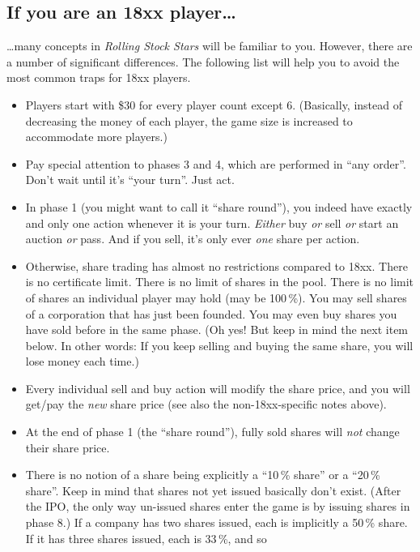\documentclass[10pt,final]{report}
\begin{document}
\begin{multicols}{2}
\section{If you are an 18xx player\dots}

\dots many concepts in \emph{Rolling Stock Stars} will be familiar to
you. However, there are a number of significant differences. The
following list will help you to avoid the most common traps for 18xx
players.

\begin{itemize}
\item Players start with \$30 for every player count except
  6. (Basically, instead of decreasing the money of each player, the
  game size is increased to accommodate more players.)
\item Pay special attention to phases 3 and 4, which are performed in
  ``any order''. Don't wait until it's ``your turn''. Just act.
\item In phase 1 (you might want to call it ``share round''), you
  indeed have exactly and only one action whenever it is your
  turn. \emph{Either} buy \emph{or} sell \emph{or} start an auction
  \emph{or} pass. And if you sell, it's only ever \emph{one} share per
  action.
\item Otherwise, share trading has almost no restrictions compared to
  18xx. There is no certificate limit. There is no limit of shares in
  the pool. There is no limit of shares an individual player may hold
  (may be 100\,\%). You may sell shares of a corporation that has just
  been founded. You may even buy shares you have sold before in the
  same phase. (Oh yes! But keep in mind the next item below. In other
  words: If you keep selling and buying the same share, you will lose
  money each time.)
\item Every individual sell and buy action will modify the share price,
  and you will get/pay the \emph{new} share price (see also the
  non-18xx-specific notes above).
\item At the end of phase 1 (the ``share round''), fully sold shares
  will \emph{not} change their share price.
\item There is no notion of a share being explicitly a ``10\,\%
  share'' or a ``20\,\% share''. Keep in mind that shares not yet
  issued basically don't exist. (After the IPO, the only way
  un-issued shares enter the game is by issuing shares in phase 8.)
  If a company has two shares issued, each is implicitly a 50\,\%
  share. If it has three shares issued, each is 33\,\%, and so

\end{itemize}
\end{multicols}
\end{document}

